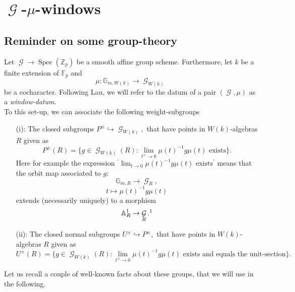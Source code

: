 \documentclass[a4paper,10,5 pt]{amsart}
\theoremstyle{definition}
\DeclareMathOperator{\Spec}{Spec}
\DeclareMathOperator{\G}{\mathcal{G}}
\begin{document}
\section{$\G$-$\mu$-windows}

\subsection{Reminder on some group-theory}
Let $\G\rightarrow \Spec(\mathbb{Z}_{p})$ be a smooth affine group scheme. Furthermore, let $k$ be a finite extension of $\mathbb{F}_{p}$ and
$$\mu\colon \mathbb{G}_{m,W(k)}\rightarrow \G_{W(k)}$$
be a cocharacter. Following Lau, we will refer to the datum of a pair $(\G,\mu)$ as a \textit{window-datum}. 
\\
To this set-up, we can associate the following weight-subgroups
\begin{enumerate}
\item[(i):] The closed subgroups $P^{\pm}\hookrightarrow \G_{W(k)},$ that have points in $W(k)$-algebras $R$ given as
$$ P^{\pm}(R)=\lbrace g\in \G_{W(k)}(R)\colon \lim_{t^{\pm}\rightarrow 0} \mu(t)^{-1}g\mu(t)\text{ exists}\rbrace.$$ Here for example the expression $^{\prime} \lim_{t\rightarrow 0} \mu(t)^{-1}g\mu(t)\text{ exists} ^{\prime}$ means that the orbit map associated to $g:$
$$\mathbb{G}_{m,R}\rightarrow \G_{R},$$
$$ t\mapsto \mu(t)^{-1}g\mu(t) $$
extends (necessarily uniquely) to a morphism
$$\mathbb{A}_{R}^{1}\rightarrow \G_{R}.\footnote{Note the difference in  sign to \cite{CGP}, because we consistently consider right-actions.}$$
\item[(ii):] The closed normal subgroups $U^{\pm}\hookrightarrow P^{\pm},$ that have points in $W(k)$-algebras $R$ given as
$$U^{\pm}(R)=\lbrace g\in \G_{W(k)}(R)\colon \lim_{t^{\pm}\rightarrow 0} \mu(t)^{-1}g\mu(t)\text{ exists and equals the unit-section} \rbrace.$$
\end{enumerate}
Let us recall a couple of well-known facts about these groups, that we will use in the following.
\end{document}
